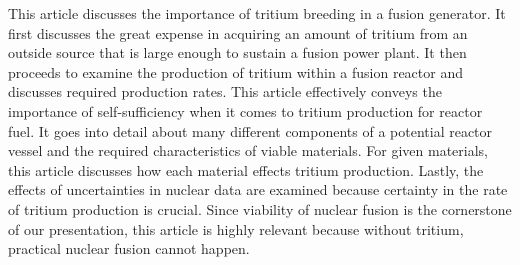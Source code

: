 \documentclass[12pt]{article}
\begin{document}
\begin{singlespace}
\begin{adjustwidth}{2.5em}{0pt}
This article discusses the importance of tritium breeding in a fusion generator.  It first discusses the great expense in acquiring an amount of tritium from an outside source that is large enough to sustain a fusion power plant.  It then proceeds to examine the production of tritium within a fusion reactor and discusses required production rates.  This article effectively conveys the importance of self-sufficiency when it comes to tritium production for reactor fuel.  It goes into detail about many different components of a potential reactor vessel and the required characteristics of viable materials.  For given materials, this article discusses how each material effects tritium production.  Lastly, the effects of uncertainties in nuclear data are examined because certainty in the rate of tritium production is crucial.  Since viability of nuclear fusion is the cornerstone of our presentation, this article is highly relevant because without tritium, practical nuclear fusion cannot happen.\newline
\end{adjustwidth}




\end{singlespace}
\end{document}
